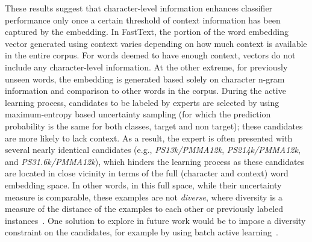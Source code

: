 These results suggest that character-level information enhances classifier performance only once a certain threshold of context information has been captured by the embedding.
In FastText, the portion of the word embedding vector generated using context varies depending on how much context is available in the entire corpus. 
For words deemed to have enough context, vectors do not include any character-level information. 
At the other extreme, for previously unseen words, the embedding is generated based solely on character n-gram information and comparison to other words in the corpus.
During the active learning process, candidates to be labeled by experts are selected by using maximum-entropy based uncertainty sampling (for which the prediction probability is the same for both classes, target and non target);
these candidates are more likely to lack context. %
As a result, the expert is often presented with several nearly identical candidates (e.g., \textit{PS13k/PMMA12k}, \textit{PS214k/PMMA12k}, and \textit{PS31.6k/PMMA12k}), which hinders the learning process as these candidates are located in close vicinity in terms of the full (character and context) word embedding space.
In other words, in this full space, while their uncertainty measure is comparable, these examples are not \textit{diverse}, where diversity is a measure of the distance of the examples to each other or previously labeled instances~\cite{brinker2003incorporating}.
One solution to explore in future work would be to impose a diversity constraint on the candidates,
for example by using batch active learning~\cite{settles2009active}.


